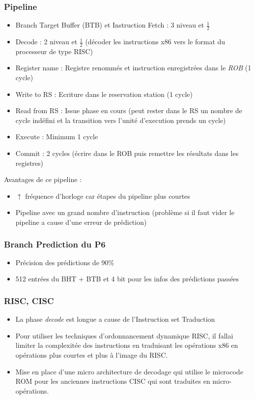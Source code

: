 \documentclass[a4paper]{article}
\begin{document}
  \subsubsection{Pipeline}
  \begin{itemize}
    \item Branch Target Buffer (BTB) et Instruction Fetch : 3 niveau et $\frac{1}{2}$
    \item Decode : 2 niveau et $\frac{1}{2}$ (décoder les instructions x86 vers le format du processeur de type RISC)
    \item Register name : Registre renommés et instruction enregistrées dans le \emph{ROB} (1 cycle)
    \item Write to RS : Ecriture dans le reservation station (1 cycle)
    \item Read from RS : Issue phase en cours (peut rester dans le RS un nombre de cycle indéfini et la transition vers l'unité d'execution prends un cycle)
    \item Execute : Minimum 1 cycle
    \item Commit : 2 cycles (écrire dans le ROB puis remettre les résultats dans les registres)
  \end{itemize}
  
  Avantages de ce pipeline :
  \begin{itemize}
    \item $\uparrow$ fréquence d'horloge car étapes du pipeline plus courtes
    \item Pipeline avec un grand nombre d'instruction (problème si il faut vider le pipeline a cause d'une erreur de prédiction)
  \end{itemize}

  \subsubsection{Branch Prediction du P6}
  \begin{itemize}
    \item Précision des prédictions de 90\%
    \item 512 entrées du BHT + BTB et 4 bit pour les infos des prédictions passées
  \end{itemize}

  \subsubsection{RISC, CISC}
  \begin{itemize}
    \item La phase \emph{decode} est longue a cause de l'Instruction set Traduction
    \item Pour utiliser les techniques d'ordonnancement dynamique RISC, il fallai limiter la complexitée des instructions en traduisant les opérations x86 en opérations plus courtes 
    et plus à l'image du RISC.
    \item Mise en place d'une micro architecture de decodage qui utilise le microcode ROM pour les anciennes instructions CISC qui sont traduites en micro-opérations.
  \end{itemize}
\end{document}
